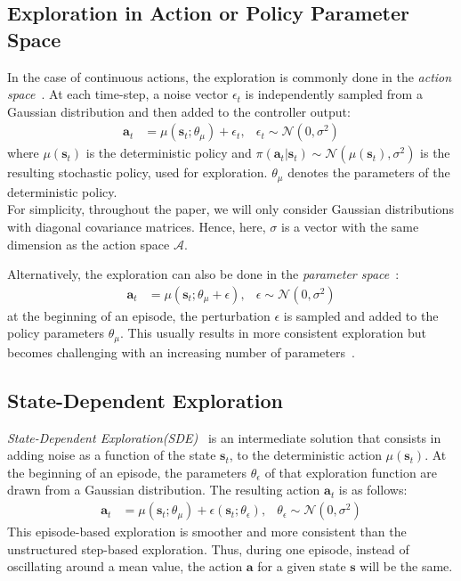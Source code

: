 \documentclass{article}
\newcommand{\aspace}{\mathcal{A}}
\newcommand{\state}{\mathbf{s}}
\newcommand{\action}{\mathbf{a}}
\newcommand{\at}{{\action_t}}
\newcommand{\st}{{\state_t}}
\newcommand{\policy}{\pi}
\newcommand{\normal}{\mathcal{N}}
\newcommand{\noise}{\epsilon}
\newcommand{\sde}{State-Dependent Exploration\xspace}
\newcommand{\SDE}{\textsc{SDE}\xspace}
\begin{document}
\subsection{Exploration in Action or Policy Parameter Space}

In the case of continuous actions, the exploration is commonly done in the \textit{action space}~\citep{schulman2015trust, lillicrap2015continuous, mnih2016asynchronous, schulman2017proximal, haarnoja2017reinforcement, fujimoto2018addressing}. At each time-step, a noise vector $\noise_t$ is independently sampled from a Gaussian distribution and then added to the controller output:
\begin{align}
  \label{eq:exploration_action_space}
  \at &= \mu(\st; \theta_\mu) + \noise_t, & \noise_t \sim \normal(0, \sigma^2)
\end{align}
where $\mu(\st)$ is the deterministic policy and $\policy(\at | \st) \sim \normal(\mu(\st), \sigma^2)$ is the resulting stochastic policy, used for exploration. $\theta_\mu$ denotes the parameters of the deterministic policy.\\
For simplicity, throughout the paper, we will only consider Gaussian distributions with diagonal covariance matrices. Hence, here, $\sigma$ is a vector with the same dimension as the action space $\aspace$.

Alternatively, the exploration can also be done in the \textit{parameter space}~\citep{ruckstiess2010exploring, plappert2017parameter, pourchot2018cem}:
\begin{align}
  \label{eq:exploration_parameter_space}
  \at &= \mu(\st; \theta_\mu + \noise), & \noise \sim \normal(0, \sigma^2)
\end{align}
at the beginning of an episode, the perturbation $\noise$ is sampled and added to the policy parameters $\theta_\mu$.
This usually results in more consistent exploration but becomes challenging with an increasing number of parameters~\citep{plappert2017parameter}.



\subsection{State-Dependent Exploration}
\label{sec:sde}

\textit{\sde(\SDE)}~\citep{ruckstiess2008state, ruckstiess2010exploring} is an intermediate solution that consists in adding noise as a function of the state $\st$, to the deterministic action $\mu(\st)$. At the beginning of an episode, the parameters $\theta_\noise$ of that exploration function are drawn from a Gaussian distribution. The resulting action $\at$ is as follows:
\begin{align}
  \label{eq:sde}
  \at &= \mu(\st; \theta_\mu) + \noise(\st; \theta_\noise), & \theta_\noise \sim \normal(0, \sigma^2)
\end{align}
This episode-based exploration is smoother and more consistent than the unstructured step-based exploration. Thus, during one episode, instead of oscillating around a mean value, the action $\action$ for a given state $\state$ will be the same.
\end{document}
